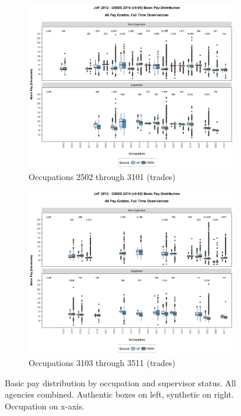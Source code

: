 \documentclass[10pt, letterpaper]{article}
\begin{document}
\begin{spacing}{1.0}
\begin{figure}[h]
    \centering
    \begin{subfigure}{1\textwidth}
        \centering
        \includegraphics[width=6in, trim={0 1in 0 0.75in}, clip]{JdFDIBBSBasicPaySupervisoryStatusOccupation481.png}
        \caption{Occupations 2502 through 3101 (trades)}
        \vspace{10pt}
    \end{subfigure}
    \begin{subfigure}{1\textwidth}
        \centering
        \includegraphics[width=6in, trim={0 1in 0 0.75in}, clip]{JdFDIBBSBasicPaySupervisoryStatusOccupation501.png}
        \caption{Occupations 3103 through 3511 (trades)}
        \vspace{10pt}
    \end{subfigure}
    \caption{Basic pay distribution by occupation and supervisor status.  All agencies combined.  Authentic boxes on left, synthetic on right.  Occupation on x-axis.}
    \label{figure:JdFDIBBSBasicPaySupervisoryStatusOccupation4}
\end{figure}


\end{spacing}
\end{document}

